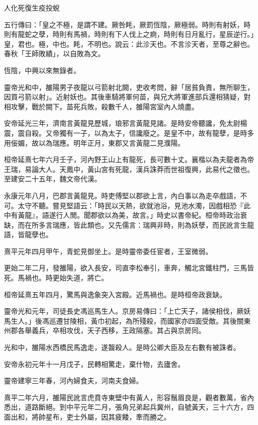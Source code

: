 
\begin{pinyinscope}
人化死復生疫投蜺

五行傳曰：「皇之不極，是謂不建。厥咎眊，厥罰恆陰，厥極弱。時則有射妖，時則有龍蛇之孽，時則有馬禍，時則有下人伐上之痾，時則有日月亂行，星辰逆行。」皇，君也。極，中也。眊，不明也。說云：此沴天也。不言沴天者，至尊之辭也。春秋「王師敗績」，以自敗為文。

恆陰，中興以來無錄者。

靈帝光和中，雒陽男子夜龍以弓箭射北闕，吏收考問，辭「居貧負責，無所聊生，因買弓箭以射」。近射妖也。其後車騎將軍何苗，與兄大將軍進部兵還相猜疑，對相攻擊，戰於闕下。苗死兵敗，殺數千人，雒陽宮室內人燒盡。

安帝延光三年，濟南言黃龍見歷城，琅邪言黃龍見諸。是時安帝聽讒，免太尉楊震，震自殺。又帝獨有一子，以為太子，信讒廢之。是皇不中，故有龍孽，是時多用佞媚，故以為瑞應。明年正月，東郡又言黃龍二見濮陽。

桓帝延熹七年六月壬子，河內野王山上有龍死，長可數十丈。襄楷以為夫龍者為帝王瑞，易論大人。天鳳中，黃山宮有死龍，漢兵誅莽而世祖復興，此易代之徵也。至建安二十五年，魏文帝代漢。

永康元年八月，巴郡言黃龍見。時吏傅堅以郡欲上言，內白事以為走卒戲語，不可。太守不聽。嘗見堅語云：「時民以天熱，欲就池浴，見池水濁，因戲相恐『此中有黃龍』，語遂行人閒。聞郡欲以為美，故言。」時史以書帝紀。桓帝時政治衰缺，而在所多言瑞應，皆此類也。又先儒言：瑞興非時，則為妖孽，而民訛言生龍語，皆龍孽也。

熹平元年四月甲午，青蛇見御坐上。是時靈帝委任宦者，王室微弱。

更始二年二月，發雒陽，欲入長安，司直李松奉引，車奔，觸北宮鐵柱門，三馬皆死。馬禍也。時更始失道，將亡。

桓帝延熹五年四月，驚馬與逸象突入宮殿。近馬禍也。是時桓帝政衰缺。

靈帝光和元年，司徒長史馮巡馬生人。京房易傳曰：「上亡天子，諸侯相伐，厥妖馬生人。」後馮巡遷甘陵相，黃巾初起，為所殘殺，而國家亦四面受敵。其後關東州郡各舉義兵，卒相攻伐，天子西移，王政隔塞。其占與京房同。

光和中，雒陽水西橋民馬逸走，遂齧殺人。是時公卿大臣及左右數有被誅者。

安帝永初元年十一月戊子，民轉相驚走，棄什物，去廬舍。

靈帝建寧三年春，河內婦食夫，河南夫食婦。

熹平二年六月，雒陽民訛言虎賁寺東壁中有黃人，形容鬚眉良是，觀者數萬，省內悉出，道路斷絕。到中平元年二月，張角兄弟起兵冀州，自號黃天，三十六方，四面出和，將帥星布，吏士外屬，因其疲餧，牽而勝之。


\end{pinyinscope}
